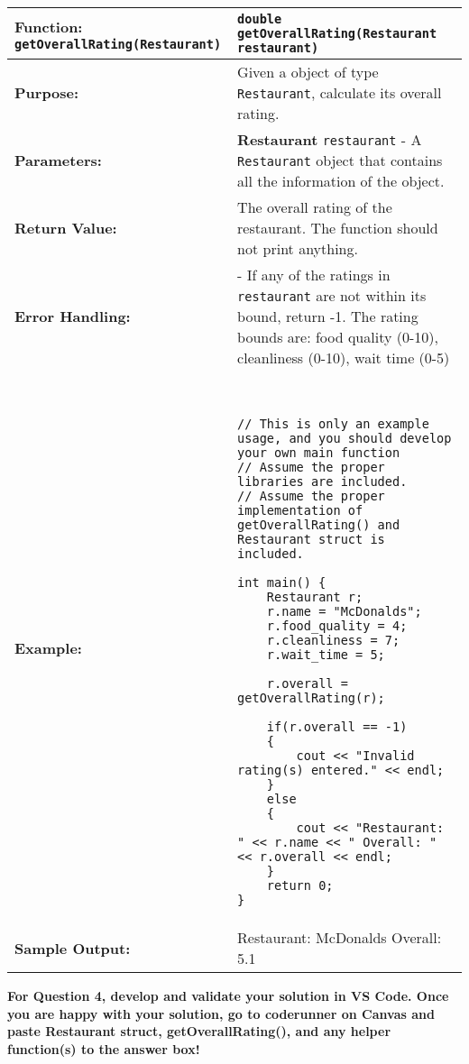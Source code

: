 \begin{longtable}{|p{1.7in}|p{4.3in}|}
\hline
\textbf{Function:}  \texttt{getOverallRating(Restaurant)} 
& \texttt{double getOverallRating(Restaurant restaurant)} \\ \hline

\textbf{Purpose:} & Given a object of type \texttt{Restaurant}, calculate its overall rating. \\ \hline

\textbf{Parameters:} & 
\textbf{Restaurant} \texttt{restaurant} - A \texttt{Restaurant} object that contains all the information of the object.
\\ \hline

\textbf{Return Value:} & The overall rating of the restaurant. The function should not print anything.
\\ \hline

\textbf{Error Handling:} & 
- If any of the ratings in \texttt{restaurant} are not within its bound, return -1. The rating bounds are: food quality (0-10), cleanliness (0-10), wait time (0-5) 
\\ \hline

\textbf{Example:} & 
\begin{example}
\begin{verbatim}


// This is only an example usage, and you should develop your own main function
// Assume the proper libraries are included.
// Assume the proper implementation of getOverallRating() and Restaurant struct is included.

int main() {
    Restaurant r; 
    r.name = "McDonalds";
    r.food_quality = 4;
    r.cleanliness = 7;
    r.wait_time = 5;

    r.overall = getOverallRating(r);

    if(r.overall == -1)
    {
        cout << "Invalid rating(s) entered." << endl;
    }
    else
    {
        cout << "Restaurant: " << r.name << " Overall: " << r.overall << endl;
    }
    return 0;
}
\end{verbatim}
\end{example}
\\ \hline

\textbf{Sample Output:} &
Restaurant: McDonalds Overall: 5.1
\\ \hline
\end{longtable}

\textbf{For Question 4, develop and validate your solution in VS Code. Once you are happy with your solution, go to coderunner on Canvas and paste Restaurant struct, getOverallRating(), and any helper function(s) to the answer box!}

